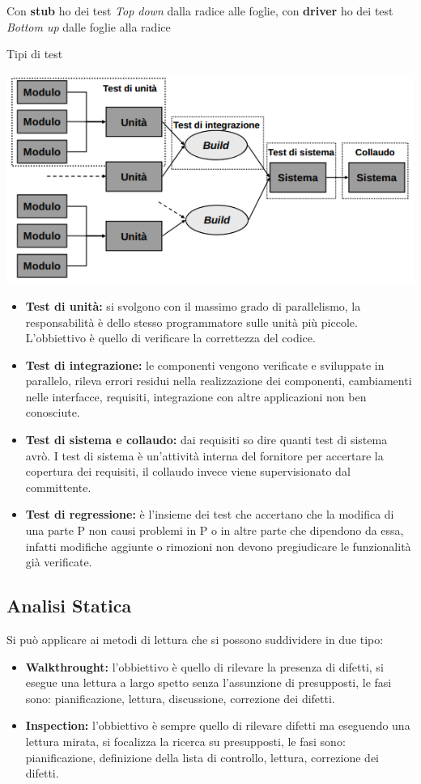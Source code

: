 Con \textbf{stub} ho dei test \textit{Top down} dalla radice alle foglie, con \textbf{driver} ho dei test \textit{Bottom up} dalle foglie alla radice

Tipi di test

\includegraphics[width=0.5\columnwidth]{img4} %

\begin{itemize}
	\item \textbf{Test di unità:} si svolgono con il massimo grado di parallelismo, la responsabilità è dello stesso programmatore sulle unità più piccole. L'obbiettivo è quello di verificare la correttezza del codice.
	\item \textbf{Test di integrazione:} le componenti vengono verificate e sviluppate in parallelo, rileva errori residui nella realizzazione dei componenti, cambiamenti nelle interfacce, requisiti, integrazione con altre applicazioni non ben conosciute.
	\item \textbf{Test di sistema e collaudo:} dai requisiti so dire quanti test di sistema avrò. I test di sistema è un'attività interna del fornitore per accertare la copertura dei requisiti, il collaudo invece viene supervisionato dal committente.
	\item \textbf{Test di regressione:} è l'insieme dei test che accertano che la modifica di una parte P non causi problemi in P o in altre parte che dipendono da essa, infatti modifiche aggiunte o rimozioni non devono pregiudicare le funzionalità già verificate.
\end{itemize}

\subsection{Analisi Statica}
Si può applicare ai metodi di lettura che si possono suddividere in due tipo:
\begin{itemize}
	\item \textbf{Walkthrought:} l'obbiettivo è quello di rilevare la presenza di difetti, si esegue una lettura a largo spetto senza l'assunzione di presupposti, le fasi sono: pianificazione, lettura, discussione, correzione dei difetti. 
	\item \textbf{Inspection:} l'obbiettivo è sempre quello di rilevare difetti ma eseguendo una lettura mirata, si focalizza la ricerca su presupposti, le fasi sono: pianificazione, definizione della lista di controllo, lettura, correzione dei difetti.
\end{itemize}

